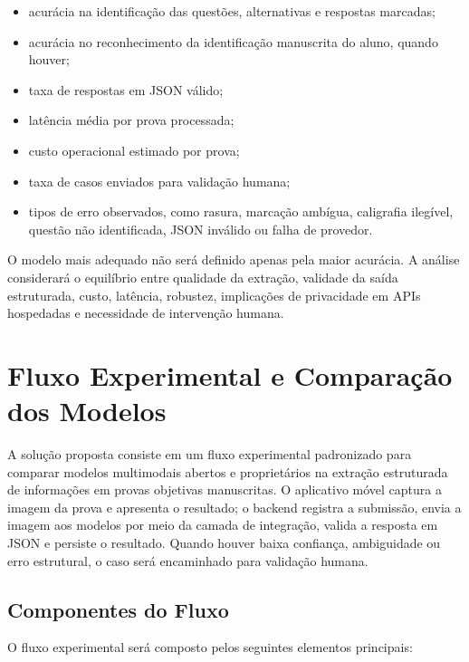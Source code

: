 \begin{itemize}
    \item acurácia na identificação das questões, alternativas e respostas marcadas;
    \item acurácia no reconhecimento da identificação manuscrita do aluno, quando houver;
    \item taxa de respostas em JSON válido;
    \item latência média por prova processada;
    \item custo operacional estimado por prova;
    \item taxa de casos enviados para validação humana;
    \item tipos de erro observados, como rasura, marcação ambígua, caligrafia ilegível, questão não identificada, JSON inválido ou falha de provedor.
\end{itemize}

O modelo mais adequado não será definido apenas pela maior acurácia. A análise considerará o equilíbrio entre qualidade da extração, validade da saída estruturada, custo, latência, robustez, implicações de privacidade em APIs hospedadas e necessidade de intervenção humana.

\chapter{Fluxo Experimental e Comparação dos Modelos}

A solução proposta consiste em um fluxo experimental padronizado para comparar modelos multimodais abertos e proprietários na extração estruturada de informações em provas objetivas manuscritas. O aplicativo móvel captura a imagem da prova e apresenta o resultado; o backend registra a submissão, envia a imagem aos modelos por meio da camada de integração, valida a resposta em JSON e persiste o resultado. Quando houver baixa confiança, ambiguidade ou erro estrutural, o caso será encaminhado para validação humana.

\section{Componentes do Fluxo}

O fluxo experimental será composto pelos seguintes elementos principais:

